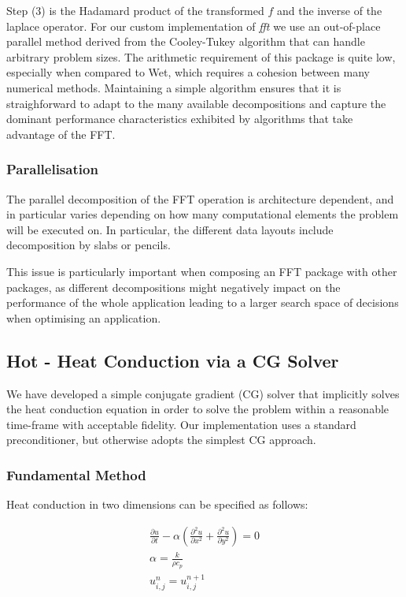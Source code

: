 \documentclass[runningheads,a4paper]{llncs}
\begin{document}
Step (3) is the Hadamard product of the transformed $f$ and the inverse of the laplace operator. For our custom implementation of \textit{fft} we use an out-of-place parallel method derived from the Cooley-Tukey algorithm that can handle arbitrary problem sizes. The arithmetic requirement of this package is quite low, especially when compared to Wet, which requires a cohesion between many numerical methods. Maintaining a simple algorithm ensures that it is straighforward to adapt to the many available decompositions and capture the dominant performance characteristics exhibited by algorithms that take advantage of the FFT.

\subsubsection{Parallelisation}

The parallel decomposition of the FFT operation is architecture dependent, and in particular varies depending on how many computational elements the problem will be executed on. In particular, the different data layouts include decomposition by slabs or pencils.

This issue is particularly important when composing an FFT package with other packages, as different decompositions might negatively impact on the performance of the whole application leading to a larger search space of decisions when optimising an application.

\subsection{Hot - Heat Conduction via a CG Solver}

\label{sec:hot}

We have developed a simple conjugate gradient (CG) solver that implicitly solves the heat conduction equation in order to solve the problem within a reasonable time-frame with acceptable fidelity. Our implementation uses a standard preconditioner, but otherwise adopts the simplest CG approach. 

\subsubsection{Fundamental Method}

Heat conduction in two dimensions can be specified as follows:

\begin{align}
  \frac{\partial u}{\partial t} - \alpha (\frac{\partial^2u}{\partial x^2} + \frac{\partial^2u}{\partial y^2}) = 0 \\ 
  \alpha = \frac{k}{\rho c_p} \\
  u^n_{i,j} = u^{n+1}_{i,j}
\end{align}
\end{document}
